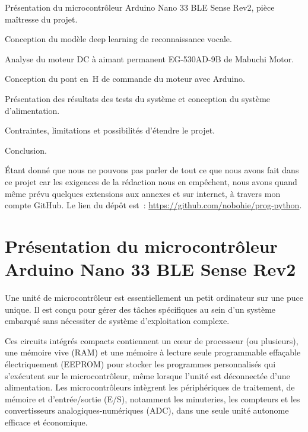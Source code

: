 \documentclass[a4paper,12pt,twoside]{report}
\theoremstyle{definition}
\theoremstyle{plain}
\theoremstyle{remark}
\begin{document}
\begin{description}[leftmargin=2cm, style=nextline]
	\item[Chapitre~\ref{chap:arduino}] Présentation du microcontrôleur Arduino Nano 33
	      BLE Sense Rev2, pièce maîtresse du projet.
	\item[Chapitre~\ref{chap:deeplearning}] Conception du modèle deep learning de
	      reconnaissance vocale.
	\item[Chapitre~\ref{chap:moteur}] Analyse du moteur DC à aimant permanent EG-530AD-9B
	      de Mabuchi Motor.
	\item[Chapitre~\ref{chap:ponth}] Conception du pont en~H de commande du moteur
	      avec Arduino.
	\item[Chapitre~\ref{chap:resultats}] Présentation des résultats des tests du système
	      et conception du système d'alimentation.
	\item[Chapitre~\ref{chap:contraintes}] Contraintes, limitations et possibilités
	      d'étendre le projet.
	\item[Chapitre~\ref{chap:conclusion}] Conclusion.
\end{description}

Étant donné que nous ne pouvons pas parler de tout ce que nous avons fait dans ce projet car
les exigences de la rédaction nous en empêchent, nous avons quand même prévu quelques
extensions aux annexes et sur internet, à travers mon compte GitHub. Le lien du dépôt
est~: \url{https://github.com/nobohie/prog-python}.

\chapter{Présentation du microcontrôleur Arduino Nano 33 BLE Sense Rev2}
\label{chap:arduino}

Une unité de microcontrôleur est essentiellement un petit ordinateur sur une puce unique.
Il est conçu pour gérer des tâches spécifiques au sein d'un système embarqué sans nécessiter
de système d'exploitation complexe.

Ces circuits intégrés compacts contiennent un c\oe ur de processeur (ou plusieurs), une
mémoire vive (\ac{RAM}) et une mémoire à lecture seule programmable effaçable
électriquement (\ac{EEPROM}) pour stocker les programmes personnalisés qui s'exécutent sur
le microcontrôleur, même lorsque l'unité est déconnectée d'une alimentation. Les
microcontrôleurs intègrent les périphériques de traitement, de mémoire et d'entrée/sortie
(E/S), notamment les minuteries, les compteurs et les convertisseurs analogiques-numériques
(\ac{ADC}), dans une seule unité autonome efficace et économique.
\end{document}
